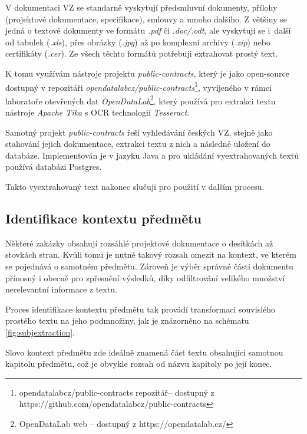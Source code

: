 \documentclass[thesis=M,czech]{FITthesis}[2019/12/23]
\begin{document}
V dokumentaci VZ se standarně vyskytují předsmluvní dokumenty, přílohy (projektové dokumentace, specifikace), smlouvy a mnoho dalšího. Z většiny se jedná o textové dokumenty ve formátu \textit{.pdf} či \textit{.doc/.odt}, ale vyskytují se i~další od tabulek (\textit{.xls}), přes obrázky (\textit{.jpg}) až po komplexní archivy (\textit{.zip}) nebo certifikáty (\textit{.cer}). Ze všech těchto formátů potřebuji extrahovat prostý text.

K tomu využívám nástroje projektu \textit{public-contracts}, který je jako open-source dostupný v repozitáři \textit{opendatalabcz/public-contracts}\footnote{opendatalabcz/public-contracts repozitář\newline --
dostupný z https://github.com/opendatalabcz/public-contracts},
vyvíjeného v rámci laboratoře otevřených dat
\textit{OpenDataLab}\footnote{OpenDataLab web -- dostupný z https://opendatalab.cz/}, který používá pro extrakci textu nástroje \textit{Apache Tika} s OCR technologií \textit{Tesseract}.

Samotný projekt \textit{public-contracts} řeší vyhledávání českých VZ, stejně jako stahování jejich dokumentace, extrakci textu z nich a následné uložení do databáze. Implementován je v jazyku Java a pro ukládání vyextrahovaných textů používá databázi Postgres.

Takto vyextrahovaný text nakonec slučuji pro použití v dalším procesu.

\subsection{Identifikace kontextu předmětu}
\label{sec:subj_context_identification}

Některé zakázky obsahují rozsáhlé projektové dokumentace o desítkách až stovkách stran. Kvůli tomu je nutné takový rozsah omezit na kontext, ve kterém se pojednává o samotném předmětu. Zároveň je výběr správné části dokumentu přínosný i obecně pro zpřesnění výsledků, díky odfiltrování velikého množství nerelevantní informace z textu.

Proces identifikace kontextu předmětu tak provádí transformaci souvislého prostého textu na jeho podmnožiny, jak je znázorněno na schématu \ref{fig:subjextraction}.

Slovo kontext předmětu zde ideálně znamená část textu obsahující samotnou kapitolu předmětu, což je obvykle rozsah od názvu kapitoly po její konec.
\end{document}
